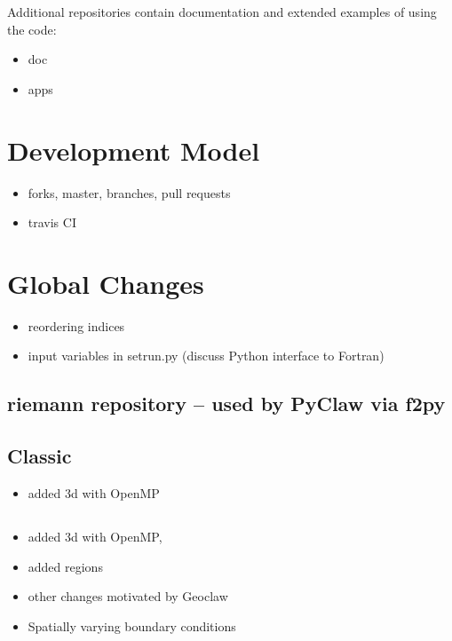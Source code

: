 \documentclass[]{siamltex}
\begin{document}
Additional repositories contain documentation and extended examples of using the code:
\begin{itemize}
    \item doc
    \item apps
\end{itemize}

\section{Development Model}
\begin{itemize}
    \item forks, master, branches, pull requests
    \item travis CI
\end{itemize}

\section{Global Changes}
\begin{itemize}
    \item reordering indices
    \item input variables in setrun.py (discuss Python interface to Fortran)
\end{itemize}

\subsection{riemann repository -- used by PyClaw via f2py}

\subsection{Classic}
\begin{itemize}
    \item added 3d with OpenMP
\end{itemize}

\subsection{\amrclaw}
\begin{itemize}
    \item added 3d with OpenMP, 
    \item added regions
    \item other changes motivated by Geoclaw
    \item Spatially varying boundary conditions
\end{itemize}
\end{document}
